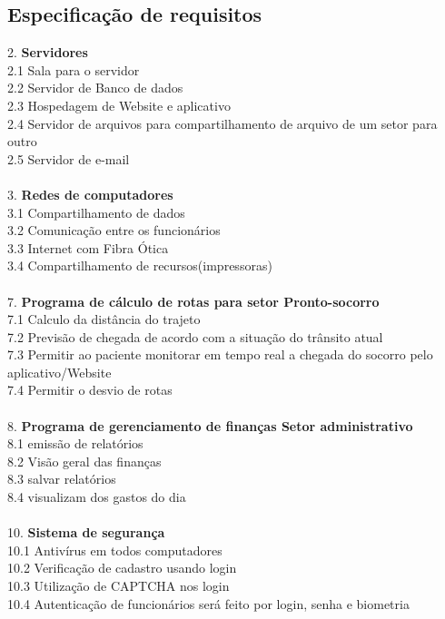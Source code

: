     \subsection{Especificação de requisitos}
2. \textbf{Servidores}\\
2.1 Sala para o servidor\\
2.2 Servidor de Banco de dados\\
2.3 Hospedagem de Website e aplicativo\\
2.4 Servidor de arquivos para compartilhamento de arquivo de um setor para outro\\
2.5 Servidor de e-mail\\
\\
3. \textbf{Redes de computadores}\\
3.1 Compartilhamento de dados\\
3.2 Comunicação entre os funcionários\\
3.3 Internet com Fibra Ótica\\
3.4 Compartilhamento de recursos(impressoras)\\
\\
7. \textbf{Programa de cálculo de rotas para setor Pronto-socorro}\\
7.1 Calculo da distância do trajeto\\
7.2 Previsão de chegada de acordo com a situação do trânsito atual\\
7.3 Permitir ao paciente monitorar em tempo real a chegada do socorro pelo aplicativo/Website\\
7.4 Permitir o desvio de rotas\\
\\
8. \textbf{Programa de gerenciamento de finanças Setor administrativo}\\
8.1 emissão de relatórios\\
8.2 Visão geral das finanças\\
8.3 salvar relatórios\\
8.4 visualizam dos gastos do dia\\
\\
10. \textbf{Sistema de segurança}\\
10.1 Antivírus em todos computadores\\
10.2 Verificação de cadastro usando login\\
10.3 Utilização de CAPTCHA nos login\\
10.4 Autenticação de funcionários será feito por login, senha e biometria\\
\\
